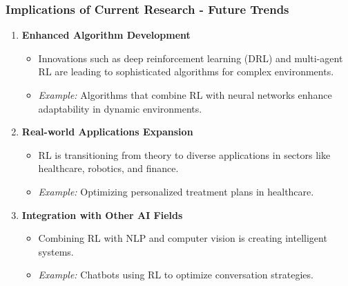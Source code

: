 \documentclass[aspectratio=169]{beamer}
\begin{document}
\begin{frame}[fragile]
  \frametitle{Implications of Current Research - Future Trends}
  \begin{enumerate}
    \item \textbf{Enhanced Algorithm Development}
    \begin{itemize}
      \item Innovations such as deep reinforcement learning (DRL) and multi-agent RL are leading to sophisticated algorithms for complex environments.
      \item \textit{Example:} Algorithms that combine RL with neural networks enhance adaptability in dynamic environments.
    \end{itemize}
    
    \item \textbf{Real-world Applications Expansion}
    \begin{itemize}
      \item RL is transitioning from theory to diverse applications in sectors like healthcare, robotics, and finance.
      \item \textit{Example:} Optimizing personalized treatment plans in healthcare.
    \end{itemize}
    
    \item \textbf{Integration with Other AI Fields}
    \begin{itemize}
      \item Combining RL with NLP and computer vision is creating intelligent systems.
      \item \textit{Example:} Chatbots using RL to optimize conversation strategies.
    \end{itemize}
  \end{enumerate}
\end{frame}
\end{document}
